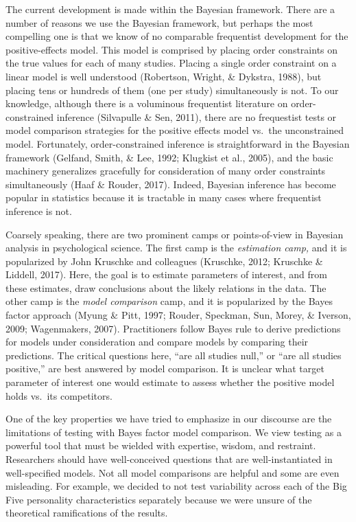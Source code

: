 \documentclass[english,man]{apa6}
\theoremstyle{definition}
\theoremstyle{definition}
\theoremstyle{remark}
\begin{document}
The current development is made within the Bayesian framework. There are
a number of reasons we use the Bayesian framework, but perhaps the most
compelling one is that we know of no comparable frequentist development
for the positive-effects model. This model is comprised by placing order
constraints on the true values for each of many studies. Placing a
single order constraint on a linear model is well understood (Robertson,
Wright, \& Dykstra, 1988), but placing tens or hundreds of them (one per
study) simultaneously is not. To our knowledge, although there is a
voluminous frequentist literature on order-constrained inference
(Silvapulle \& Sen, 2011), there are no frequestist tests or model
comparison strategies for the positive effects model vs.~the
unconstrained model. Fortunately, order-constrained inference is
straightforward in the Bayesian framework (Gelfand, Smith, \& Lee, 1992;
Klugkist et al., 2005), and the basic machinery generalizes gracefully
for consideration of many order constraints simultaneously (Haaf \&
Rouder, 2017). Indeed, Bayesian inference has become popular in
statistics because it is tractable in many cases where frequentist
inference is not.

Coarsely speaking, there are two prominent camps or points-of-view in
Bayesian analysis in psychological science. The first camp is the
\emph{estimation camp,} and it is popularized by John Kruschke and
colleagues (Kruschke, 2012; Kruschke \& Liddell, 2017). Here, the goal
is to estimate parameters of interest, and from these estimates, draw
conclusions about the likely relations in the data. The other camp is
the \emph{model comparison} camp, and it is popularized by the Bayes
factor approach (Myung \& Pitt, 1997; Rouder, Speckman, Sun, Morey, \&
Iverson, 2009; Wagenmakers, 2007). Practitioners follow Bayes rule to
derive predictions for models under consideration and compare models by
comparing their predictions. The critical questions here, \enquote{are
all studies null,} or \enquote{are all studies positive,} are best
answered by model comparison. It is unclear what target parameter of
interest one would estimate to assess whether the positive model holds
vs.~its competitors.

One of the key properties we have tried to emphasize in our discourse
are the limitations of testing with Bayes factor model comparison. We
view testing as a powerful tool that must be wielded with expertise,
wisdom, and restraint. Researchers should have well-conceived questions
that are well-instantiated in well-specified models. Not all model
comparisons are helpful and some are even misleading. For example, we
decided to not test variability across each of the Big Five personality
characteristics separately because we were unsure of the theoretical
ramifications of the results.
\end{document}
